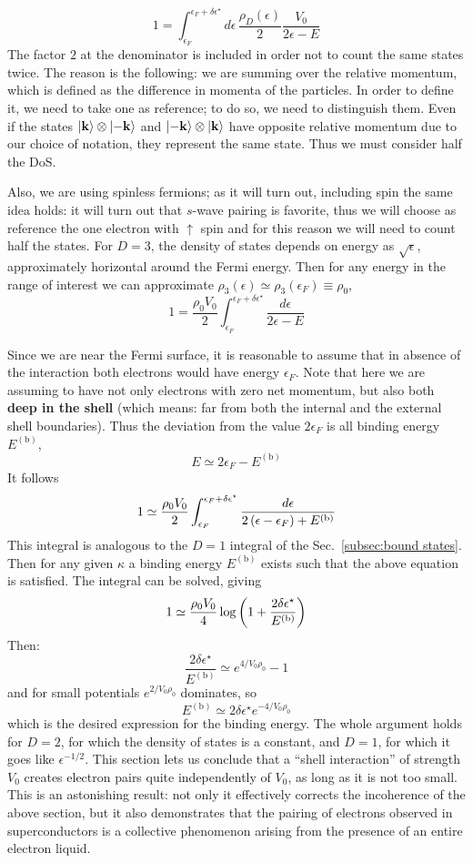 \[
	1 = \int_{\epsilon_F}^{\epsilon_F+\delta\epsilon^\star} d\epsilon \, \frac{\rho_D(\epsilon)}{2} \frac{V_0}{2 \epsilon - E}
\]
The factor $2$ at the denominator is included in order not to count the same states twice. The reason is the following: we are summing over the relative momentum, which is defined as the difference in momenta of the particles. In order to define it, we need to take one as reference; to do so, we need to distinguish them. Even if the states $\ket{\mathbf{k}} \otimes \ket{-\mathbf{k}}$ and $\ket{-\mathbf{k}} \otimes \ket{\mathbf{k}}$ have opposite relative momentum due to our choice of notation, they represent the same state. Thus we must consider half the DoS.

Also, we are using spinless fermions; as it will turn out, including spin the same idea holds: it will turn out that $s$-wave pairing is favorite, thus we will choose as reference the one electron with $\uparrow$ spin and for this reason we will need to count half the states. For $D=3$, the density of states depends on energy as $\sqrt{\epsilon}$, approximately horizontal around the Fermi energy. Then for any energy in the range of interest we can approximate $\rho_3 (\epsilon) \simeq \rho_3 (\epsilon_F) \equiv \rho_0$,
\[
	1 = \frac{\rho_0 V_0}{2} \int_{\epsilon_F}^{\epsilon_F+\delta\epsilon^\star} \frac{d\epsilon}{2 \epsilon - E}
\]

Since we are near the Fermi surface, it is reasonable to assume that in absence of the interaction both electrons would have energy $\epsilon_F$. Note that here we are assuming to have not only electrons with zero net momentum, but also both \textbf{deep in the shell} (which means: far from both the internal and the external shell boundaries). Thus the deviation from the value $2\epsilon_F$ is all binding energy $E^{(\mathrm{b})}$,
\[
	E \simeq 2 \epsilon_F - E^{(\mathrm{b})}
\]
It follows
\[
	1 \simeq \frac{\rho_0 V_0}{2} \int_{\epsilon_F}^{\epsilon_F+\delta\epsilon^\star} \frac{d\epsilon}{2\left({\epsilon-\epsilon_F}\right) + E^{(\mathrm{b})}}
\]
This integral is analogous to the $D=1$ integral of the Sec.~\ref{subsec:bound states}. Then for any given $\kappa$ a binding energy $E^{(\mathrm{b})}$ exists such that the above equation is satisfied. The integral can be solved, giving
\[
	1 \simeq \frac{\rho_0 V_0}{4} \log \left({1+ \frac{2\delta\epsilon^\star}{E^{(\mathrm{b})}}}\right)
\]
Then:
\[
	\frac{2\delta\epsilon^\star}{E^{(\mathrm{b})}} \simeq e^{4/V_0 \rho_0} - 1
\]
and for small potentials $e^{2/V_0 \rho_0}$ dominates, so
\[
	E^{(\mathrm{b})} \simeq 2\delta\epsilon^\star e^{-4/V_0 \rho_0}
\]
which is the desired expression for the binding energy. The whole argument holds for $D=2$, for which the density of states is a constant, and $D=1$, for which it goes like $\epsilon^{-1/2}$. This section lets us conclude that a ``shell interaction'' of strength $V_0$ creates electron pairs quite independently of $V_0$, as long as it is not too small. This is an astonishing result: not only it effectively corrects the incoherence of the above section, but it also demonstrates that the pairing of electrons observed in superconductors is a collective phenomenon arising from the presence of an entire electron liquid.

